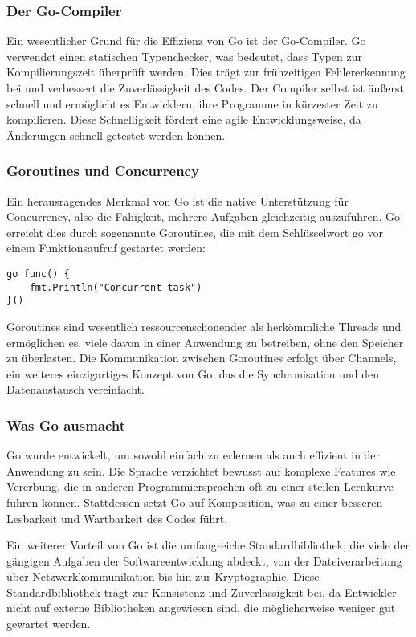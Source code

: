 \subsubsection{Der Go-Compiler}
Ein wesentlicher Grund für die Effizienz von Go ist der Go-Compiler. Go verwendet einen statischen Typenchecker, was bedeutet, dass Typen zur Kompilierungszeit überprüft werden. Dies trägt zur frühzeitigen Fehlererkennung bei und verbessert die Zuverlässigkeit des Codes. Der Compiler selbst ist äußerst schnell und ermöglicht es Entwicklern, ihre Programme in kürzester Zeit zu kompilieren. Diese Schnelligkeit fördert eine agile Entwicklungsweise, da Änderungen schnell getestet werden können.

\subsubsection{Goroutines und Concurrency}

Ein herausragendes Merkmal von Go ist die native Unterstützung für Concurrency, also die Fähigkeit, mehrere Aufgaben gleichzeitig auszuführen. Go erreicht dies durch sogenannte Goroutines, die mit dem Schlüsselwort go vor einem Funktionsaufruf gestartet werden:

\begin{lstlisting}[language=Golang]
go func() {
    fmt.Println("Concurrent task")
}()
\end{lstlisting}

Goroutines sind wesentlich ressourcenschonender als herkömmliche Threads und ermöglichen es, viele davon in einer Anwendung zu betreiben, ohne den Speicher zu überlasten. Die Kommunikation zwischen Goroutines erfolgt über Channels, ein weiteres einzigartiges Konzept von Go, das die Synchronisation und den Datenaustausch vereinfacht. \cite{Kuree}

\subsubsection{Was Go ausmacht}
Go wurde entwickelt, um sowohl einfach zu erlernen als auch effizient in der Anwendung zu sein. Die Sprache verzichtet bewusst auf komplexe Features wie Vererbung, die in anderen Programmiersprachen oft zu einer steilen Lernkurve führen können. Stattdessen setzt Go auf Komposition, was zu einer besseren Lesbarkeit und Wartbarkeit des Codes führt.

Ein weiterer Vorteil von Go ist die umfangreiche Standardbibliothek, die viele der gängigen Aufgaben der Softwareentwicklung abdeckt, von der Dateiverarbeitung über Netzwerkkommunikation bis hin zur Kryptographie. Diese Standardbibliothek trägt zur Konsistenz und Zuverlässigkeit bei, da Entwickler nicht auf externe Bibliotheken angewiesen sind, die möglicherweise weniger gut gewartet werden.

